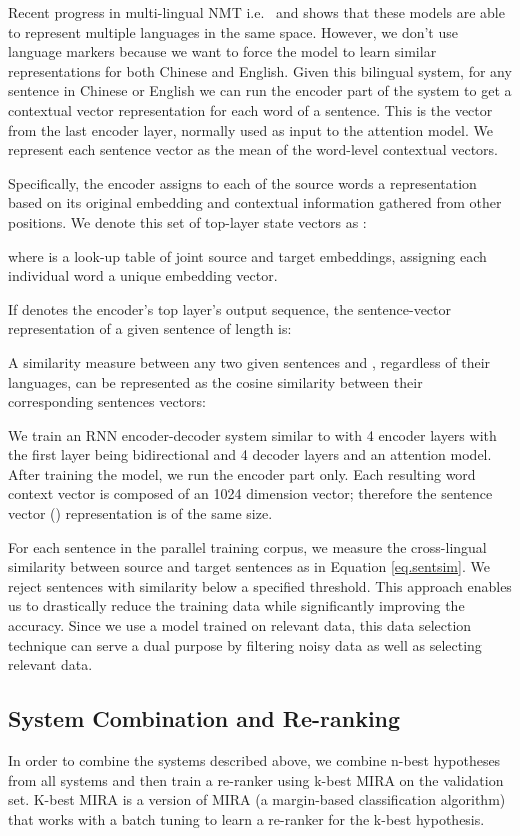\documentclass[a4paper]{article}
\begin{document}
\begin{CJK*}{UTF8}{gbsn}
Recent progress in  multi-lingual NMT i.e.\ \cite{johnson2016google} and \cite{unimt} shows that these models are able to represent multiple languages in the same space. However, we don't use language markers because we want to force the model to learn similar representations for both Chinese and English. Given this bilingual system, for any sentence in Chinese or English we can run the encoder part of the system to get a contextual vector representation for each word of a sentence. This is the vector from the last encoder layer, normally used as input to the attention model. We represent each sentence vector as the mean of the word-level contextual vectors.

Specifically, the encoder assigns to each of the  source words a representation based on its original embedding and contextual information gathered from other positions. We denote this set of  top-layer state vectors as :

where  is a look-up table of joint source and target embeddings, assigning each individual word a unique embedding vector.

If  denotes the encoder's top layer's output sequence,
the sentence-vector representation  of a given sentence  of length  is:


A similarity measure   between any two given sentences  and , regardless of their languages, can be represented as the cosine similarity between their corresponding sentences vectors:



We train an RNN encoder-decoder system similar to \cite{wu2016google} with 4 encoder layers  with the first layer being bidirectional and 4 decoder layers and an attention model.   After training the model, we run the encoder part only.  Each resulting word context vector is composed of an 1024 dimension  vector; therefore the sentence vector () representation is of the same size.

For each sentence in the parallel training corpus, we measure the cross-lingual  similarity between source and target sentences as in Equation \ref{eq.sentsim}. We reject sentences with  similarity below a specified threshold. This approach enables us to drastically reduce the training data while significantly improving the accuracy. Since we use a model trained on relevant data, this data selection technique can serve a dual purpose by filtering noisy data as well as selecting relevant data.




\subsection{System Combination and Re-ranking}
\label{sec.sc}
In order to combine the systems described above, we combine n-best hypotheses from all systems and then train a re-ranker using k-best MIRA on the validation set. K-best MIRA \cite{kb-mira}  is a version of MIRA (a margin-based classification algorithm) that  works with a batch tuning  to learn a re-ranker for the k-best hypothesis.


\end{CJK*}
\end{document}
